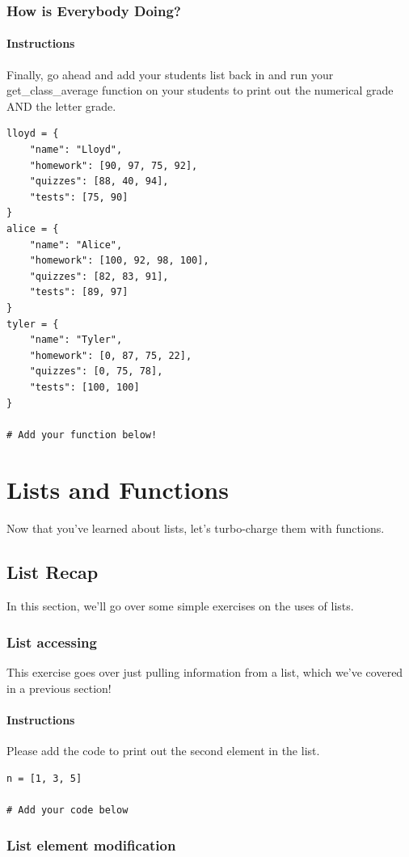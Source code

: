 \documentclass[12pt,a4paper,final,twoside,onecolumn,titlepage]{book}
\begin{document}
\subsection{How is Everybody Doing?}
\subsubsection{Instructions}

Finally, go ahead and add your students list back in and run your get\_class\_average function on your students to print out the numerical grade AND the letter grade.
\begin{lstlisting}
lloyd = {
    "name": "Lloyd",
    "homework": [90, 97, 75, 92],
    "quizzes": [88, 40, 94],
    "tests": [75, 90]
}
alice = {
    "name": "Alice",
    "homework": [100, 92, 98, 100],
    "quizzes": [82, 83, 91],
    "tests": [89, 97]
}
tyler = {
    "name": "Tyler",
    "homework": [0, 87, 75, 22],
    "quizzes": [0, 75, 78],
    "tests": [100, 100]
}

# Add your function below!

\end{lstlisting}

\chapter{Lists and Functions}
Now that you've learned about lists, let's turbo-charge them with functions.

\section{List Recap}
In this section, we'll go over some simple exercises on the uses of lists.
\subsection{List accessing}
This exercise goes over just pulling information from a list, which we've covered in a previous section!
\subsubsection{Instructions}
Please add the code to print out the second element in the list.
\begin{lstlisting}
n = [1, 3, 5]

# Add your code below
\end{lstlisting}
\subsection{List element modification}
\end{document}
